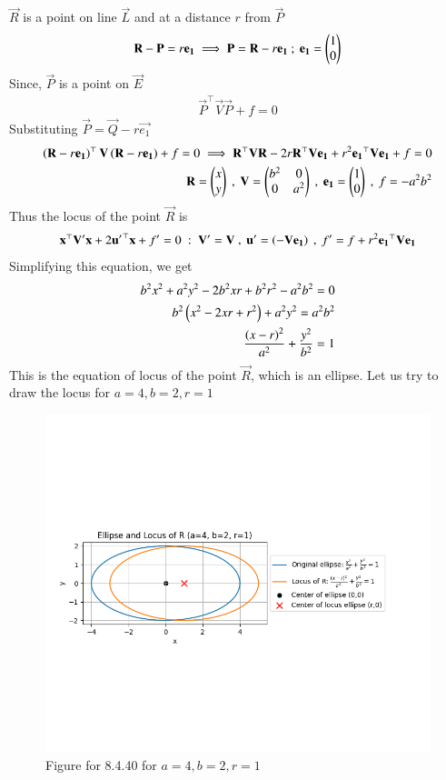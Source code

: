 \documentclass[journal,12pt,onecolumn]{IEEEtran}
\theoremstyle{remark}
\begin{document}
$\vec{R}$ is a point on line $\vec{L}$ and at a distance $r$ from $\vec{P}$
\begin{align}
    \mathbf{R} - \mathbf{P}= r\mathbf{e_1} \implies \mathbf{P}=\mathbf{R} - r\mathbf{e_1}\  ; \ \mathbf{e_1}=\begin{pmatrix}1\\0\end{pmatrix}
\end{align}
Since, $\vec{P}$ is a point on $\vec{E}$
\begin{align}
    \vec{P}^{\top}\vec{V}\vec{P} + f=0
\end{align}
Substituting $\vec{P} = \vec{Q} -r\vec{e_1}$
\begin{align}
    \left(\mathbf{R} -r\mathbf{e_1}\right)^{\top}\mathbf{V}\left(\mathbf{R} -r\mathbf{e_1}\right) + f=0 \implies \mathbf{R}^{\top}\mathbf{V}\mathbf{R} - 2r\mathbf{R}^{\top}\mathbf{V}\mathbf{e_1} + r^2\mathbf{e_1}^{\top}\mathbf{V}\mathbf{e_1}+f=0\\
    \mathbf{R}= \begin{pmatrix}x\\y\end{pmatrix} \ , \ \mathbf{V}=\begin{pmatrix}b^2 & 0 \\ 0 & a^2\end{pmatrix} \ , \ \mathbf{e_1}=\begin{pmatrix}1\\0\end{pmatrix} \ , \ f=-a^2b^2
\end{align}
Thus the locus of the point $\vec{R}$ is
\begin{align}
    \mathbf{x}^{\top}\mathbf{V'}\mathbf{x} + 2 \mathbf{u'}^{\top}\mathbf{x} + f'=0 \ : \ \mathbf{V'}=\mathbf{V} \ , \ \mathbf{u'}=\left(-\mathbf{V}\mathbf{e_1}\right) \ , \ f'=f+ r^2\mathbf{e_1}^{\top}\mathbf{V}\mathbf{e_1}
\end{align}
Simplifying this equation, we get
\begin{align}
    b^2x^2 + a^2y^2 - 2b^2 xr + b^2r^2 - a^2b^2=0\\
    b^2\left(x^2 - 2xr + r^2\right) + a^2y^2 =a^2b^2\\
    \dfrac{\left(x-r\right)^2}{a^2} + \dfrac{y^2}{b^2} =1
\end{align}
This is the equation of locus of the point $\vec{R}$, which is an ellipse.
Let us try to draw the locus for $a=4, b=2 , r=1 $
\begin{figure}[H]
        \centering
        \includegraphics[width=1\columnwidth]{figs/1.png}
        \caption{Figure for 8.4.40 for $a=4, b=2, r=1$}
        \label{fig:placeholder}
    \end{figure}
\end{document}
